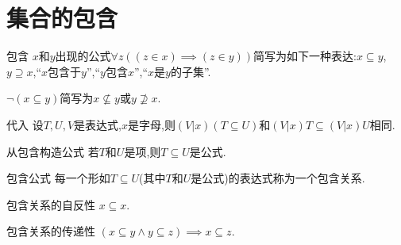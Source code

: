 \section{集合的包含}

\begin{definition}{包含}{}
	$x$和$y$出现的公式$\forall z\left(\left(z\in x\right)\implies\left(z\in y\right)\right)$简写为如下一种表达:$x\subseteq y$,$y\supseteq x$,``$x$包含于$y$'',``$y$包含$x$'',``$x$是$y$的子集''.
	
	$\neg\left(x\subseteq y\right)$简写为$x\nsubseteq y$或$y\nsupseteq x$.
\end{definition}

\begin{metatheorem}{代入}{}
	设$T,U,V$是表达式,$x$是字母,则$\left(V|x\right)\left(T\subseteq U\right)$和$\left(V|x\right)T\subseteq\left(V|x\right)U$相同.
\end{metatheorem}

\begin{metatheorem}{从包含构造公式}{}
	若$T$和$U$是项,则$T\subseteq U$是公式.
\end{metatheorem}

\begin{definition}{包含公式}{}
	每一个形如$T\subseteq U$(其中$T$和$U$是公式)的表达式称为一个包含关系.
\end{definition}

\begin{proposition}{包含关系的自反性}{}
	$x\subseteq x$.
\end{proposition}

\begin{proposition}{包含关系的传递性}{}
	$\left(x\subseteq y\wedge y\subseteq z\right)\implies x\subseteq z$.
\end{proposition}

